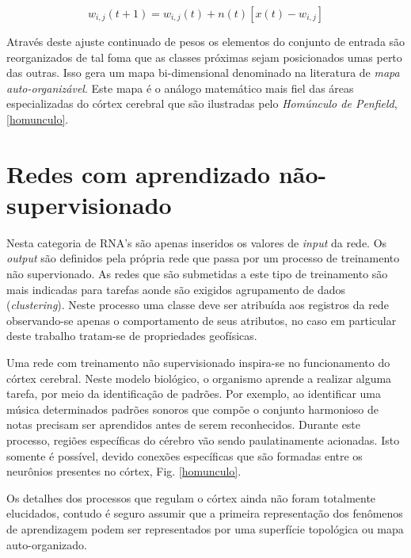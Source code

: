 \begin{equation}
w_{i,j}(t+1)=w_{i,j}(t)+n(t)[x(t)-w_{i,j}]
\label{ajuste de pesos}
\end{equation}

Através deste ajuste continuado de pesos os elementos do conjunto de entrada são reorganizados de tal foma que as classes próximas sejam posicionados umas perto das outras. Isso gera um mapa bi-dimensional denominado na literatura de \textit{mapa auto-organizável}. Este mapa é o análogo matemático mais fiel das áreas especializadas do córtex cerebral que são ilustradas pelo \textit{Homúnculo de Penfield}, \ref{homunculo}.

\section{Redes com aprendizado não-supervisionado}

Nesta categoria de RNA's são apenas inseridos os valores de \textit{input} da rede. Os \textit{output} são definidos pela própria rede que passa por um processo de treinamento não supervionado. As redes que são submetidas a este tipo de treinamento são mais indicadas para tarefas aonde são exigidos agrupamento de dados (\textit{clustering}). Neste processo uma classe deve ser atribuída aos registros da rede observando-se apenas o comportamento de seus atributos, no caso em particular deste trabalho tratam-se de propriedades geofísicas.

Uma rede com treinamento não supervisionado inspira-se no funcionamento do córtex cerebral. Neste modelo biológico, o organismo aprende a realizar alguma tarefa, por meio da identificação de padrões. Por exemplo, ao identificar uma música determinados padrões sonoros que compõe o conjunto harmonioso de notas precisam ser aprendidos antes de serem reconhecidos. Durante este processo, regiões específicas do cérebro vão sendo paulatinamente acionadas. Isto somente é possível, devido conexões específicas que são formadas entre os neurônios
presentes no córtex, Fig. \ref{homunculo}.

Os detalhes dos processos que regulam o córtex ainda não foram totalmente elucidados, contudo é seguro assumir que a primeira representação dos fenômenos de aprendizagem podem ser representados por uma superfície topológica ou mapa auto-organizado. 

